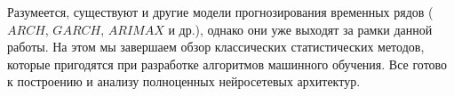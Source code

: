Разумеется, существуют и другие модели прогнозирования временных рядов  ($ARCH$, $GARCH$, 
$ARIMAX$ и др.), однако они уже выходят за рамки данной работы. На этом мы завершаем обзор 
классических статистических методов, которые пригодятся при разработке алгоритмов машинного обучения. 
Все готово к построению и анализу полноценных нейросетевых архитектур.











